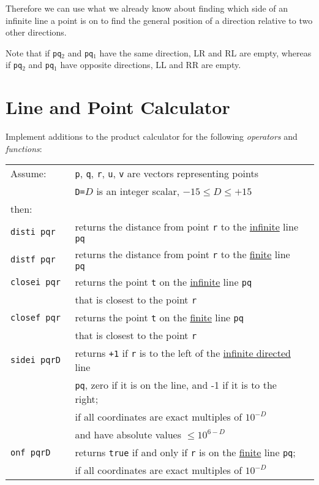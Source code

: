 \documentclass[12pt]{article}
\begin{document}
Therefore we can use what we already know about finding which side
of an infinite line a point is on
to find the general position of a direction relative to
two other directions.

Note that if
{\tt pq$_2$} and {\tt pq$_1$} have the same direction,
LR and RL are empty, whereas if
{\tt pq$_2$} and {\tt pq$_1$} have opposite directions,
LL and RR are empty.

\newpage

\section{Line and Point Calculator}
Implement additions to the product calculator for
the following {\em operators} and {\em functions}:
\begin{center}
\begin{tabular}{l@{~~~~}l@{~~~~}l}
Assume: & {\tt p}, {\tt q}, {\tt r}, {\tt u}, {\tt v}
          are vectors representing points \\
	& {\tt D=}$D$ is an integer scalar, $-15\le D\le +15$ \\
then: \\[1ex]
\tt disti~pqr  & returns the distance from point {\tt r} to the
		\underline{infinite} line {\tt pq} \\
\tt distf~pqr  & returns the distance from point {\tt r} to the
		\underline{finite} line {\tt pq} \\
\tt closei~pqr  & returns the point {\tt t} on the \underline{infinite}
                  line {\tt pq} \\
		& that is closest to the point {\tt r} \\
\tt closef~pqr  & returns the point {\tt t} on the \underline{finite}
                  line {\tt pq} \\
		& that is closest to the point {\tt r} \\
\tt sidei~pqrD & returns {\tt +1} if {\tt r} is to the left of the
                \underline{infinite directed} line \\
	      & {\tt pq}, zero if it is on the line,
	        and -1 if it is to the right; \\
	      & if all coordinates are exact multiples of $10^{-D}$ \\
	      & and have absolute values $\le 10^{6-D}$ \\
\tt onf~pqrD & returns {\tt true} if and only if {\tt r} is on the
                \underline{finite} line {\tt pq}; \\
	      & if all coordinates are exact multiples of $10^{-D}$ \\

\end{tabular}
\end{center}
\end{document}
